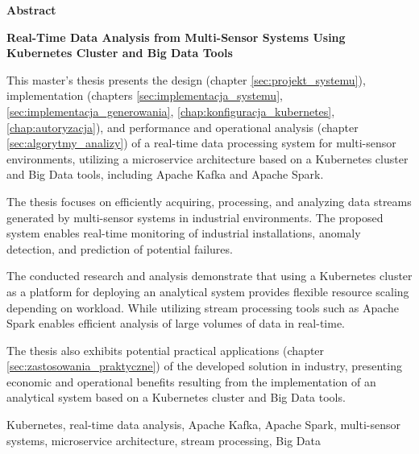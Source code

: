 \begin{abstract_en}
\begin{center}
\textbf{\large Abstract}
\end{center}

\begin{center}
 \textbf{Real-Time Data Analysis from Multi-Sensor Systems Using Kubernetes Cluster and Big Data Tools}\\
\end{center}

This master's thesis presents the design (chapter \ref{sec:projekt_systemu}), implementation (chapters \ref{sec:implementacja_systemu}, \ref{sec:implementacja_generowania}, \ref{chap:konfiguracja_kubernetes}, \ref{chap:autoryzacja}), and performance and operational analysis (chapter \ref{sec:algorytmy_analizy}) of a real-time data processing system for multi-sensor environments, utilizing a microservice architecture based on a Kubernetes cluster and Big Data tools, including Apache Kafka and Apache Spark.

The thesis focuses on efficiently acquiring, processing, and analyzing data streams generated by multi-sensor systems in industrial environments. The proposed system enables real-time monitoring of industrial installations, anomaly detection, and prediction of potential failures.

The conducted research and analysis demonstrate that using a Kubernetes cluster as a platform for deploying an analytical system provides flexible resource scaling depending on workload. While utilizing stream processing tools such as Apache Spark enables efficient analysis of large volumes of data in real-time.

The thesis also exhibits potential practical applications (chapter \ref{sec:zastosowania_praktyczne}) of the developed solution in industry, presenting economic and operational benefits resulting from the implementation of an analytical system based on a Kubernetes cluster and Big Data tools.

\begin{keywords_en}
Kubernetes, real-time data analysis, Apache Kafka, Apache Spark, multi-sensor systems, microservice architecture, stream processing, Big Data
\end{keywords_en}
\end{abstract_en}